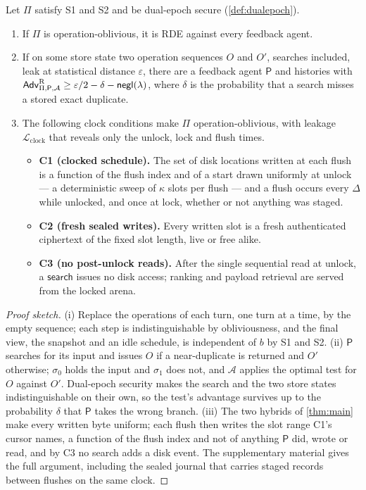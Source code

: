 \begin{theorem}
\label{thm:reactive}
Let $\Pi$ satisfy S1 and S2 and be dual-epoch secure (\cref{def:dualepoch}).
\begin{enumerate}
\item[(i)] If $\Pi$ is operation-oblivious, it is RDE against every feedback agent.
\item[(ii)] If on some store state two operation sequences $O$ and $O'$, searches included, leak at
statistical distance $\varepsilon$, there are a feedback agent $\mathsf{P}$ and histories with
$\mathsf{Adv}^{\mathrm{R}}_{\Pi,\mathsf{P},\mathcal{A}} \ge \varepsilon/2 - \delta - \mathsf{negl}(\lambda)$, where $\delta$ is the
probability that a search misses a stored exact duplicate.
\item[(iii)] The following clock conditions make $\Pi$ operation-oblivious, with leakage
$\mathcal{L}_{\mathrm{clock}}$ that reveals only the unlock, lock and flush times.
\begin{itemize}
\item \textbf{C1 (clocked schedule).} The set of disk locations written at each flush is a function
of the flush index and of a start drawn uniformly at unlock --- a deterministic sweep of $\kappa$
slots per flush --- and a flush occurs every $\Delta$ while unlocked, and once at lock, whether or
not anything was staged.
\item \textbf{C2 (fresh sealed writes).} Every written slot is a fresh authenticated ciphertext of
the fixed slot length, live or free alike.
\item \textbf{C3 (no post-unlock reads).} After the single sequential read at unlock, a
$\mathsf{search}$ issues no disk access; ranking and payload retrieval are served from the locked
arena.
\end{itemize}
\end{enumerate}
\end{theorem}

\begin{proof}[Proof sketch]
(i) Replace the operations of each turn, one turn at a time, by the empty sequence; each step is
indistinguishable by obliviousness, and the final view, the snapshot and an idle schedule, is
independent of $b$ by S1 and S2. (ii) $\mathsf{P}$ searches for its input and issues $O$ if a
near-duplicate is returned and $O'$ otherwise; $\sigma_0$ holds the input and $\sigma_1$ does not,
and $\mathcal{A}$ applies the optimal test for $O$ against $O'$. Dual-epoch security makes the
search and the two store states indistinguishable on their own, so the test's advantage survives up
to the probability $\delta$ that $\mathsf{P}$ takes the wrong branch. (iii) The two hybrids of
\cref{thm:main} make every written byte uniform; each flush then writes the slot range C1's cursor
names, a function of the flush index and not of anything $\mathsf{P}$ did, wrote or read, and by C3 no
search adds a disk event. The supplementary material gives the full argument, including the sealed
journal that carries staged records between flushes on the same clock.
\end{proof}

